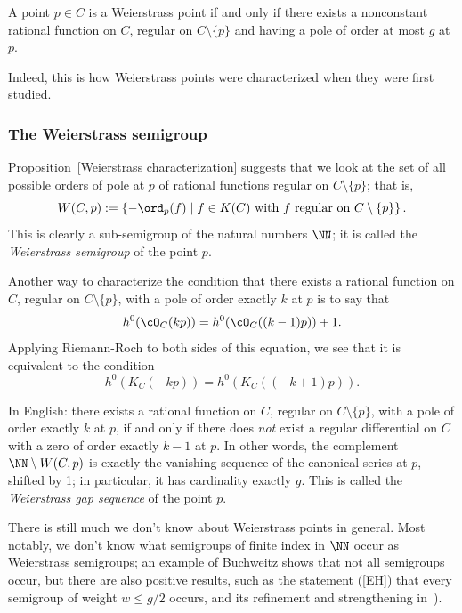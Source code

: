 \begin{proposition}\label{Weierstrass characterization}
A point $p \in C$ is a Weierstrass point if and only if there exists a nonconstant rational function on $C$, regular on $C \setminus \{p\}$ and having a pole of order at most $g$ at $p$.
\end{proposition} 

Indeed, this is how Weierstrass points were characterized when they were first studied.

\subsubsection{The Weierstrass semigroup} 

Proposition~\ref{Weierstrass characterization} suggests that we look at the set of all possible orders of pole at $p$ of rational functions regular on $C \setminus \{p\}$; that is,
$$
W(C,p) := \left\{ -\ord_p(f) \mid f \in K(C) \text{ with $f$ regular on } C \setminus \{p\} \right\}.
$$
This is clearly a sub-semigroup of the natural numbers $\NN$; it is called the \emph{Weierstrass semigroup} of the point $p$.  

Another way to characterize the condition that there exists a rational function on $C$, regular on $C \setminus \{p\}$, with a pole of order exactly $k$ at $p$ is to say that
$$
h^0(\cO_C(kp)) = h^0(\cO_C((k-1)p)) + 1.
$$
Applying Riemann-Roch to both sides of this equation, we see that it is equivalent to the condition
$$
h^0(K_C(-kp)) = h^0(K_C((-k+1)p)).
$$

In English: there exists a rational function on $C$, regular on $C \setminus \{p\}$, with a pole of order exactly $k$ at $p$, if and only if there does \emph{not} exist a regular differential on $C$ with a zero of order exactly $k-1$ at $p$.
 In other words, the complement $\NN \setminus W(C,p)$ is exactly the vanishing sequence of the canonical series at $p$, shifted by 1; in particular, it has cardinality  exactly $g$. This is called the \emph{Weierstrass gap sequence} of the point $p$.

There is still much we don't know about Weierstrass points in general. Most notably, we don't know what semigroups of finite index in $\NN$ occur as Weierstrass semigroups; an example of Buchweitz shows that not all semigroups occur, but there are also positive results, such as the statement ([EH]) that every semigroup of weight $w \leq g/2$ occurs, and its refinement and strengthening in~\cite{MR3892968}).


